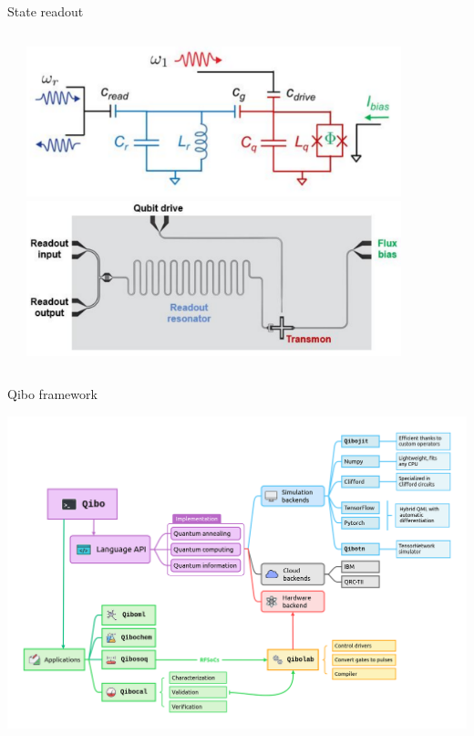 \documentclass[aspectratio=169,10pt]{beamer}
\begin{document}
%
\begin{frame}[t,fragile]{State readout}
  \begin{columns}
    \begin{column}{0.4\textwidth}
      
    \end{column}
    \begin{column}{0.6\textwidth}
      \begin{center}
          \vspace{2mm}
          \includegraphics[width=0.85\textwidth]{figures/TransmonCircuit.png}
          \vspace{8mm}
          \includegraphics[width=0.85\textwidth]{figures/TransmonBoard.png}
      \end{center}
    \end{column}
  \end{columns}
\end{frame}
%
%  

\begin{frame}[t,fragile]{Qibo framework}
  \begin{center}
      \includegraphics[height=0.80\paperheight]{figures/qibo_ecosystem.png}
  \end{center}
\end{frame}
\end{document}
